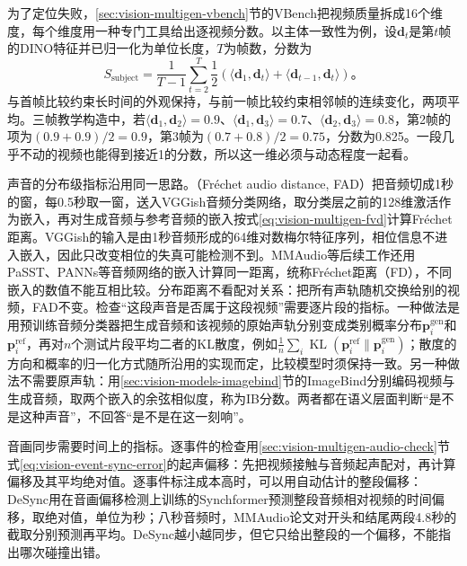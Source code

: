 为了定位失败，\ref{sec:vision-multigen-vbench}节的VBench把视频质量拆成16个维度，每个维度用一种专门工具给出逐视频分数。以主体一致性为例，设$\bm d_t$是第$t$帧的DINO特征并已归一化为单位长度，$T$为帧数，分数为
\begin{equation}
  S_{\mathrm{subject}}
  =\frac{1}{T-1}\sum_{t=2}^{T}
    \frac12\left(\langle\bm d_1,\bm d_t\rangle+\langle\bm d_{t-1},\bm d_t\rangle\right)\text{。}
  \label{eq:vision-multigen-subject-consistency}
\end{equation}
与首帧比较约束长时间的外观保持，与前一帧比较约束相邻帧的连续变化，两项平均。三帧教学构造中，若$\langle\bm d_1,\bm d_2\rangle=0.9$、$\langle\bm d_1,\bm d_3\rangle=0.7$、$\langle\bm d_2,\bm d_3\rangle=0.8$，第2帧的项为$(0.9+0.9)/2=0.9$，第3帧为$(0.7+0.8)/2=0.75$，分数为0.825。一段几乎不动的视频也能得到接近1的分数，所以这一维必须与动态程度一起看。

声音的分布级指标沿用同一思路。（Fréchet audio distance, FAD）把音频切成1秒的窗，每0.5秒取一窗，送入VGGish音频分类网络，取分类层之前的128维激活作为嵌入，再对生成音频与参考音频的嵌入按式\eqref{eq:vision-multigen-fvd}计算Fréchet距离。VGGish的输入是由1秒音频形成的64维对数梅尔特征序列，相位信息不进入嵌入，因此只改变相位的失真可能检测不到。MMAudio等后续工作还用PaSST、PANNs等音频网络的嵌入计算同一距离，统称Fréchet距离（FD），不同嵌入的数值不能互相比较。分布距离不看配对关系：把所有声轨随机交换给别的视频，FAD不变。检查“这段声音是否属于这段视频”需要逐片段的指标。一种做法是用预训练音频分类器把生成音频和该视频的原始声轨分别变成类别概率分布$\bm p_i^{\mathrm{gen}}$和$\bm p_i^{\mathrm{ref}}$，再对$n$个测试片段平均二者的KL散度，例如$\frac1n\sum_i\operatorname{KL}(\bm p_i^{\mathrm{ref}}\|\bm p_i^{\mathrm{gen}})$；散度的方向和概率的归一化方式随所沿用的实现而定，比较模型时须保持一致。另一种做法不需要原声轨：用\ref{sec:vision-models-imagebind}节的ImageBind分别编码视频与生成音频，取两个嵌入的余弦相似度，称为IB分数。两者都在语义层面判断“是不是这种声音”，不回答“是不是在这一刻响”。

音画同步需要时间上的指标。逐事件的检查用\ref{sec:vision-multigen-audio-check}节式\eqref{eq:vision-event-sync-error}的起声偏移：先把视频接触与音频起声配对，再计算偏移及其平均绝对值。逐事件标注成本高时，可以用自动估计的整段偏移：DeSync用在音画偏移检测上训练的Synchformer预测整段音频相对视频的时间偏移，取绝对值，单位为秒；八秒音频时，MMAudio论文对开头和结尾两段4.8秒的截取分别预测再平均。DeSync越小越同步，但它只给出整段的一个偏移，不能指出哪次碰撞出错。

